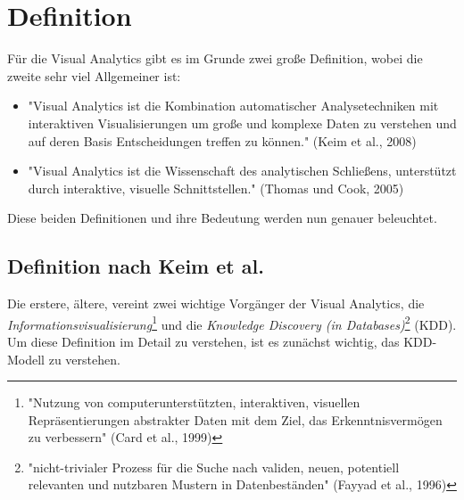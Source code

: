	\section{Definition}
		Für die Visual Analytics gibt es im Grunde zwei große Definition, wobei die zweite sehr viel Allgemeiner ist:
		\begin{itemize}
			\item "Visual Analytics ist die Kombination automatischer Analysetechniken mit interaktiven Visualisierungen um große und komplexe Daten zu verstehen und auf deren Basis Entscheidungen treffen zu können." (Keim et al., 2008)
			\item "Visual Analytics ist die Wissenschaft des analytischen Schließens, unterstützt durch interaktive, visuelle Schnittstellen." (Thomas und Cook, 2005)
		\end{itemize}
		Diese beiden Definitionen und ihre Bedeutung werden nun genauer beleuchtet.

		\subsection{Definition nach Keim et al.}
			Die erstere, ältere, vereint zwei wichtige Vorgänger der Visual Analytics, die \emph{Informationsvisualisierung}\footnote{"Nutzung von computerunterstützten, interaktiven, visuellen Repräsentierungen abstrakter Daten mit dem Ziel, das Erkenntnisvermögen zu verbessern" (Card et al., 1999)} und die \emph{Knowledge Discovery (in Databases)}\footnote{"nicht-trivialer Prozess für die Suche nach validen, neuen, potentiell relevanten und nutzbaren Mustern in Datenbeständen" (Fayyad et al., 1996)} (KDD). Um diese Definition im Detail zu verstehen, ist es zunächst wichtig, das KDD-Modell zu verstehen.

